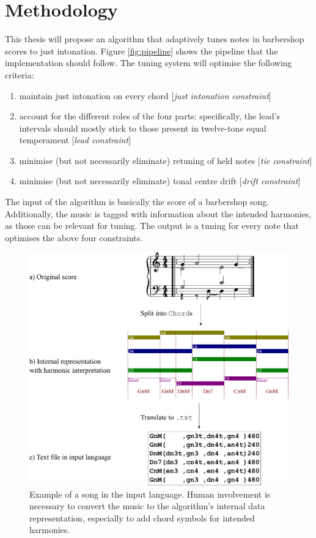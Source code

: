\documentclass[a4paper]{article}
\begin{document}
\section{Methodology}
\label{methodoloy}
This thesis will propose an algorithm that adaptively tunes notes in barbershop scores to just intonation. Figure \ref{fig:pipeline} shows the pipeline that the implementation should follow. The tuning system will optimise the following criteria:
\begin{enumerate}
	\item maintain just intonation on every chord [\textit{just intonation constraint}]
	\item account for the different roles of the four parts: specifically, the lead's intervals should mostly stick to those present in twelve-tone equal temperament [\textit{lead constraint}]
	\item minimise (but not necessarily eliminate) retuning of held notes [\textit{tie constraint}]
	\item minimise (but not necessarily eliminate) tonal centre drift [\textit{drift constraint}]
\end{enumerate}

The input of the algorithm is basically the score of a barbershop song. Additionally, the music is tagged with information about the intended harmonies, as those can be relevant for tuning. The output is a tuning for every note that optimises the above four constraints.

\begin{figure}
	\centering
	\includegraphics[height=0.35\textheight]{Figures/benedettiV.pdf}
	\caption{Example of a song in the input language. Human involvement is necessary to convert the music to the algorithm's internal data representation, especially to add chord symbols for intended harmonies.}
	\label{fig:input}
\end{figure}
\end{document}

